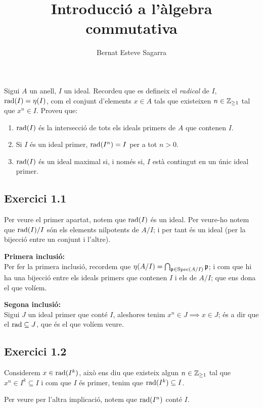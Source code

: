 \documentclass[11pt, a4paper]{article}
\title{Introducció a l'àlgebra commutativa}
\author{Bernat Esteve Sagarra}
\begin{document}
\pagestyle{fancy}
% 
\begin{tcolorbox}[title=\section{Exercici 1}]
    Sigui $A$ un anell, $I$ un ideal. Recordeu que es defineix el \textit{radical} de $I$, $\operatorname*{rad}(I)=\eta(I)$, com el conjunt d'elements $x\in A$ tals que existeixen $n\in\mathbb Z_{\geq 1}$ tal que $x^n\in I$. Proveu que:
    \begin{enumerate}
        \item $\operatorname*{rad}(I)$ és la intersecció de tots els ideals primers de $A$ que contenen $I$.
        \item Si $I$ és un ideal primer, $\operatorname*{rad}(I^n)=I$ per a tot $n>0$.
        \item $\operatorname*{rad}(I)$ és un ideal maximal si, i només si, $I$ està contingut en un únic ideal primer.
    \end{enumerate}
\end{tcolorbox}
\subsection{Exercici 1.1}
Per veure el primer apartat, notem que $\operatorname*{rad}(I)$ és un ideal. Per veure-ho notem que $\operatorname*{rad}(I)/I$ són els elements nilpotents de $A/I$; i per tant és un ideal (per la bijecció entre un conjunt i l'altre).\par
\textbf{Primera inclusió:}\\
Per fer la primera inclusió, recordem que $\eta(A/I)=\bigcap_{\mathfrak{p}\in\operatorname*{Spec}(A/I)}\mathfrak p$; i com que hi ha una bijecció entre els ideals primers que contenen $I$ i els de $A/I$; que ens dona el que volíem.\par
\textbf{Segona inclusió:}\\
Sigui $J$ un ideal primer que conté $I$, aleshores tenim $x^n\in J \implies x\in J$; és a dir que el $\operatorname*{rad}\subseteq J$, que és el que volíem veure.
\subsection{Exercici 1.2}
Considerem $x\in\operatorname*{rad}(I^k)$, això ens diu que existeix algun $n\in\mathbb Z_{\geq 1}$ tal que $x^n\in I^k\subseteq I$ i com que $I$ és primer, tenim que $\operatorname*{rad}(I^k)\subseteq I$.\par
Per veure per l'altra implicació, notem que $\operatorname*{rad}(I^n)$ conté $I$.
\end{document}
